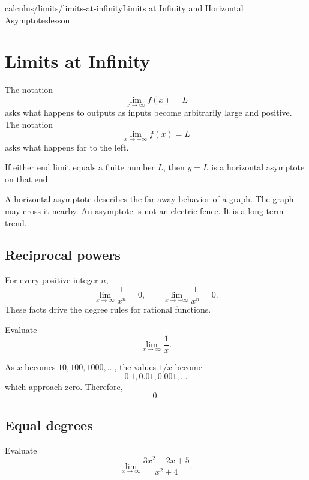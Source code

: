 \begin{webpage}{calculus/limits/limits-at-infinity}{Limits at Infinity and Horizontal Asymptotes}{lesson}
\section{Limits at Infinity}


The notation
\[
  \lim_{x\to\infty}f(x)=L
\]
asks what happens to outputs as inputs become arbitrarily large and positive. The notation
\[
  \lim_{x\to-\infty}f(x)=L
\]
asks what happens far to the left.

If either end limit equals a finite number \(L\), then \(y=L\) is a horizontal asymptote on that end.

\begin{bgconcept}
A horizontal asymptote describes the far-away behavior of a graph. The graph may cross it nearby. An asymptote is not an electric fence. It is a long-term trend.
\end{bgconcept}

\subsection{Reciprocal powers}

For every positive integer \(n\),
\[
  \lim_{x\to\infty}\frac1{x^n}=0,
  \qquad
  \lim_{x\to-\infty}\frac1{x^n}=0.
\]
These facts drive the degree rules for rational functions.

\begin{bgguided}[title={One over a growing number}]
Evaluate
\[
  \lim_{x\to\infty}\frac1x.
\]

\begin{bgsolution}
As \(x\) becomes \(10,100,1000,\ldots\), the values \(1/x\) become
\[
  0.1,0.01,0.001,\ldots
\]
which approach zero. Therefore,
\[
  \boxed{0}.
\]
\end{bgsolution}
\end{bgguided}

\subsection{Equal degrees}

\begin{bgexample}[title={Divide by the largest denominator power}]
Evaluate
\[
  \lim_{x\to\infty}\frac{3x^2-2x+5}{x^2+4}.
\]


\end{bgexample}
\end{webpage}
